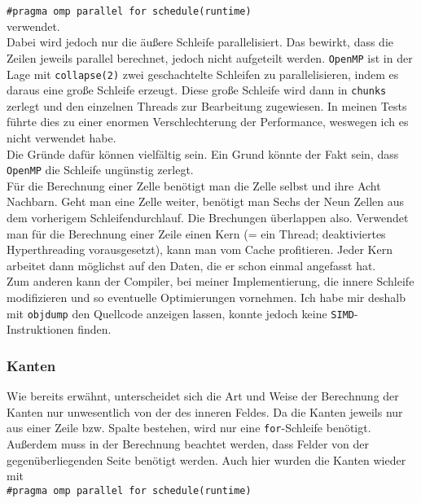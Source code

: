 \documentclass[german,plainarticle,hyperref,utf8,appendix]{zihpub}
\begin{document}
   	\texttt{\#pragma omp parallel for schedule(runtime)}\\
   	
   	verwendet.\\
   	Dabei wird jedoch nur die äußere Schleife parallelisiert. Das bewirkt, dass die Zeilen jeweils parallel berechnet, jedoch nicht aufgeteilt werden. \texttt{OpenMP} ist in der Lage mit \texttt{collapse(2)} zwei geschachtelte Schleifen zu parallelisieren, indem es daraus eine große Schleife erzeugt. Diese große Schleife wird dann in \texttt{chunks} zerlegt und den einzelnen Threads zur Bearbeitung zugewiesen. In meinen Tests führte dies zu einer enormen Verschlechterung der Performance, weswegen ich es nicht verwendet habe.\\
   	
   	Die Gründe dafür können vielfältig sein. Ein Grund könnte der Fakt sein, dass \texttt{OpenMP} die Schleife ungünstig zerlegt.\\
   	Für die Berechnung einer Zelle benötigt man die Zelle selbst und ihre Acht Nachbarn. Geht man eine Zelle weiter, benötigt man Sechs der Neun Zellen aus dem vorherigem Schleifendurchlauf. Die Brechungen überlappen also. Verwendet man für die Berechnung einer Zeile einen Kern (= ein Thread; deaktiviertes Hyperthreading vorausgesetzt), kann man vom Cache profitieren. Jeder Kern arbeitet dann möglichst auf den Daten, die er schon einmal angefasst hat.\\
   	
   	Zum anderen kann der Compiler, bei meiner Implementierung, die innere Schleife modifizieren und so eventuelle Optimierungen vornehmen. Ich habe mir deshalb mit \texttt{objdump} den Quellcode anzeigen lassen, konnte jedoch keine \texttt{SIMD}-Instruktionen finden.
   	
   	\subsubsection{Kanten}
   	
   	Wie bereits erwähnt, unterscheidet sich die Art und Weise der Berechnung der Kanten nur unwesentlich von der des inneren Feldes. Da die Kanten jeweils nur aus einer Zeile bzw. Spalte bestehen, wird nur eine \texttt{for}-Schleife benötigt. Außerdem muss in der Berechnung beachtet werden, dass Felder von der gegenüberliegenden Seite benötigt werden.
   	Auch hier wurden die Kanten wieder mit\\
   	
   	\texttt{\#pragma omp parallel for schedule(runtime)}\\
   	
\end{document}

